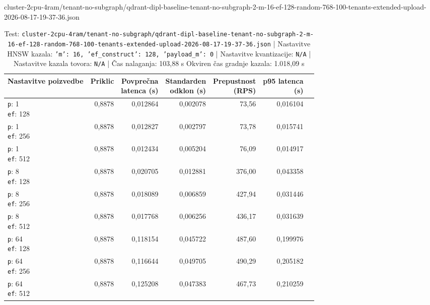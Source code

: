 \begin{table}[htbp]
  \centering
\small
  \caption{cluster-2cpu-4ram/tenant-no-subgraph/qdrant-dipl-baseline-tenant-no-subgraph-2-m-16-ef-128-random-768-100-tenants-extended-upload-2026-08-17-19-37-36.json}
  \label{tab:cluster-2cpu-4ram:tenant-no-subgraph:qdrant-dipl-baseline-tenant-no-subgraph-2-m-16-ef-128-random-768-100-tenants-extended-upload-2026-08-17-19-37-36.json}
  \begin{tabularx}{\textwidth}{Xrrrrrr}
    \toprule
    Nastavitve poizvedbe & Priklic & \makecell{Povprečna\\latenca (s)} & \makecell{Standarden\\odklon (s)} & \makecell{Prepustnost\\(RPS)} & \makecell{p95 latenca\\(s)}  \\
    \midrule
    \makecell{\texttt{p}: 1\\\texttt{ef}: 128} & 0,8878 & 0,012864 & 0,002078 & 73,56 & 0,016104 \\
    \makecell{\texttt{p}: 1\\\texttt{ef}: 256} & 0,8878 & 0,012827 & 0,002797 & 73,78 & 0,015741 \\
    \makecell{\texttt{p}: 1\\\texttt{ef}: 512} & 0,8878 & 0,012434 & 0,005204 & 76,09 & 0,014917 \\
    \makecell{\texttt{p}: 8\\\texttt{ef}: 128} & 0,8878 & 0,020705 & 0,012881 & 376,00 & 0,043358 \\
    \makecell{\texttt{p}: 8\\\texttt{ef}: 256} & 0,8878 & 0,018089 & 0,006859 & 427,94 & 0,031446 \\
    \makecell{\texttt{p}: 8\\\texttt{ef}: 512} & 0,8878 & 0,017768 & 0,006256 & 436,17 & 0,031639 \\
    \makecell{\texttt{p}: 64\\\texttt{ef}: 128} & 0,8878 & 0,118154 & 0,045722 & 487,60 & 0,199976 \\
    \makecell{\texttt{p}: 64\\\texttt{ef}: 256} & 0,8878 & 0,116644 & 0,049705 & 490,29 & 0,205182 \\
    \makecell{\texttt{p}: 64\\\texttt{ef}: 512} & 0,8878 & 0,125208 & 0,047383 & 467,73 & 0,210259 \\
    \bottomrule
  \end{tabularx}
\caption* {Test: \texttt{cluster-2cpu-4ram/tenant-no-subgraph/qdrant-dipl-baseline-tenant-no-subgraph-2-m-16-ef-128-random-768-100-tenants-extended-upload-2026-08-17-19-37-36.json} | Nastavitve HNSW kazala: \texttt{{'m': 16, 'ef\_construct': 128, 'payload\_m': 0}} | Nastavitve kvantizacije: \texttt{N/A} | Nastavitve kazala tovora: \texttt{N/A} | Čas nalaganja: 103,88 s Okviren čas gradnje kazala: 1.018,09 s}\end{table}


